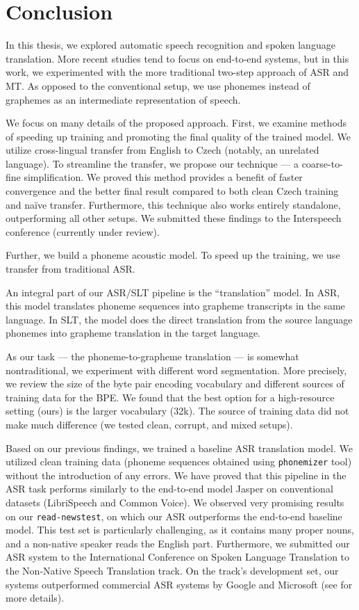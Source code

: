 \chapter*{Conclusion}
\label{chap:conclusion}

In this thesis, we explored automatic speech recognition and spoken language translation. More recent studies tend to focus on end-to-end systems, but in this work, we experimented with the more traditional two-step approach of ASR and MT. As opposed to the conventional setup, we use phonemes instead of graphemes as an intermediate representation of speech.

We focus on many details of the proposed approach. First, we examine methods of speeding up training and promoting the final quality of the trained model. We utilize cross-lingual transfer from English to Czech (notably, an unrelated language). To streamline the transfer, we propose our technique --- a coarse-to-fine simplification. We proved this method provides a benefit of faster convergence and the better final result compared to both clean Czech training and na\"ive transfer. Furthermore, this technique also works entirely standalone, outperforming all other setups. We submitted these findings to the Interspeech conference (currently under review).

Further, we build a phoneme acoustic model. To speed up the training, we use transfer from traditional ASR.

An integral part of our ASR/SLT pipeline is the ``translation'' model. In ASR, this model translates phoneme sequences into grapheme transcripts in the same language. In SLT, the model does the direct translation from the source language phonemes into grapheme translation in the target language. 

As our task --- the phoneme-to-grapheme translation --- is somewhat nontraditional, we experiment with different word segmentation. More precisely, we review the size of the byte pair encoding vocabulary and different sources of training data for the BPE. We found that the best option for a high-resource setting (ours) is the larger vocabulary (32k). The source of training data did not make much difference (we tested clean, corrupt, and mixed setups).

Based on our previous findings, we trained a baseline ASR translation model. We utilized clean training data (phoneme sequences obtained using \texttt{phonemizer} tool) without the introduction of any errors. We have proved that this pipeline in the ASR task performs similarly to the end-to-end model Jasper on conventional datasets (LibriSpeech and Common Voice). We observed very promising results on our \texttt{read-newstest}, on which our ASR outperforms the end-to-end baseline model. This test set is particularly challenging, as it contains many proper nouns, and a non-native speaker reads the English part. Furthermore, we submitted our ASR system to the International Conference on Spoken Language Translation to the Non-Native Speech Translation track. On the track's development set, our systems outperformed commercial ASR systems by Google and Microsoft (see  for more details).

